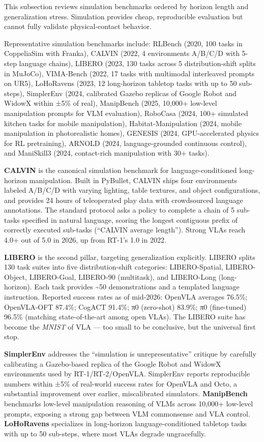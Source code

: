 \documentclass{article}
\begin{document}
This subsection reviews simulation benchmarks ordered by horizon length and generalization stress. Simulation provides cheap, reproducible evaluation but cannot fully validate physical-contact behavior.

Representative simulation benchmarks include: RLBench (2020, 100 tasks in CoppeliaSim with Franka), CALVIN (2022, 4 environments A/B/C/D with 5-step language chains), LIBERO (2023, 130 tasks across 5 distribution-shift splits in MuJoCo), VIMA-Bench (2022, 17 tasks with multimodal interleaved prompts on UR5), LoHoRavens (2023, 12 long-horizon tabletop tasks with up to 50 sub-steps), SimplerEnv (2024, calibrated Gazebo replicas of Google Robot and WidowX within ±5\% of real), ManipBench (2025, 10,000+ low-level manipulation prompts for VLM evaluation), RoboCasa (2024, 100+ simulated kitchen tasks for mobile manipulation), Habitat-Manipulation (2024, mobile manipulation in photorealistic homes), GENESIS (2024, GPU-accelerated physics for RL pretraining), ARNOLD (2024, language-grounded continuous control), and ManiSkill3 (2024, contact-rich manipulation with 30+ tasks).

\textbf{CALVIN} \cite{mees2022calvinabenchmarkfo} is the canonical simulation benchmark for language-conditioned long-horizon manipulation. Built in PyBullet, CALVIN ships four environments labeled A/B/C/D with varying lighting, table textures, and object configurations, and provides 24 hours of teleoperated play data with crowdsourced language annotations. The standard protocol asks a policy to complete a chain of 5 sub-tasks specified in natural language, scoring the longest contiguous prefix of correctly executed sub-tasks (``CALVIN average length''). Strong VLAs reach 4.0+ out of 5.0 in 2026, up from RT-1's 1.0 in 2022.

\textbf{LIBERO} \cite{liu2023llmpempoweringlarg} is the second pillar, targeting generalization explicitly. LIBERO splits 130 task suites into five distribution-shift categories: LIBERO-Spatial, LIBERO-Object, LIBERO-Goal, LIBERO-90 (multitask), and LIBERO-Long (long-horizon). Each task provides \textasciitilde50 demonstrations and a templated language instruction. Reported success rates as of mid-2026: OpenVLA averages 76.5\%; OpenVLA-OFT 87.4\%; CogACT 91.4\%; π0 (zero-shot) 83.9\%; π0 (fine-tuned) 96.5\% (matching state-of-the-art among open VLAs). The LIBERO suite has become the \emph{MNIST} of VLA --- too small to be conclusive, but the universal first stop.

\textbf{SimplerEnv} \cite{li2024cogactafoundationa} addresses the ``simulation is unrepresentative'' critique by carefully calibrating a Gazebo-based replica of the Google Robot and WidowX environments used by RT-1/RT-2/OpenVLA. SimplerEnv reports reproducible numbers within ±5\% of real-world success rates for OpenVLA and Octo, a substantial improvement over earlier, miscalibrated simulators. \textbf{ManipBench} \cite{zhao2025manipbenchbenchmar} benchmarks low-level manipulation reasoning of VLMs across 10,000+ low-level prompts, exposing a strong gap between VLM commonsense and VLA control. \textbf{LoHoRavens} \cite{zhang2023lohoravensalonghor} specializes in long-horizon language-conditioned tabletop tasks with up to 50 sub-steps, where most VLAs degrade ungracefully.
\end{document}
